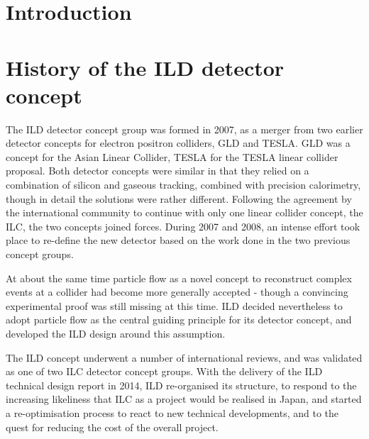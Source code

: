 \documentclass[%
 amsmath,amssymb,
 aps,
]{revtex4-1}
\begin{document}


\maketitle
\tableofcontents

\newpage

\section{\label{sec:level1}Introduction}

\section{History of the ILD detector concept}
The ILD detector concept group was formed in 2007, as a merger from two earlier detector concepts for electron positron colliders, GLD and TESLA. GLD was a concept for the Asian Linear Collider, TESLA for the TESLA linear collider proposal. Both detector concepts were similar in that they relied on a combination of silicon and gaseous tracking, combined with precision calorimetry, though in detail the solutions were rather different. Following the agreement by the international community to continue with only one linear collider concept, the ILC, the two concepts joined forces. During 2007 and 2008, an intense effort took place to re-define the new detector based on the work done in the two previous concept groups. 

At about the same time particle flow as a novel concept to reconstruct complex events at a collider had become more generally accepted - though a convincing experimental proof was still missing at this time. ILD decided nevertheless to adopt particle flow as the central guiding principle for its detector concept, and developed the ILD design around this assumption. 

The ILD concept underwent a number of international reviews, and was validated as one of two ILC detector concept groups. With the delivery of the ILD technical design report in 2014, ILD re-organised its structure, to respond to the increasing likeliness that ILC as a project would be realised in Japan, and started a re-optimisation process to react to new technical developments, and to the quest for reducing the cost of the overall project. 
\end{document}
